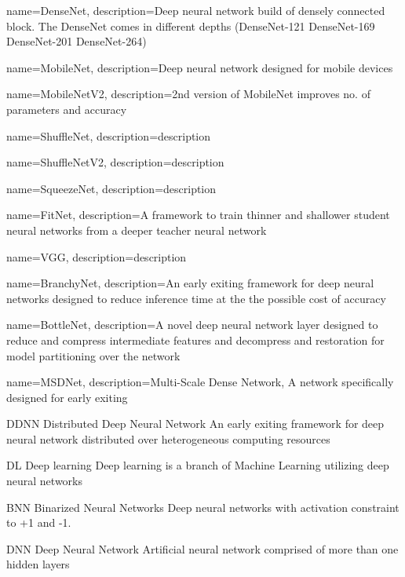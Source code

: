 {
	name={DenseNet},
	description={Deep neural network build of densely connected block. The DenseNet comes in different depths (DenseNet-121 DenseNet-169 DenseNet-201 DenseNet-264)}
}

{
	name={MobileNet},
	description={Deep neural network designed for mobile devices}
}

{
	name={MobileNetV2},
	description={2nd version of MobileNet improves no. of parameters and accuracy}
}

{
	name={ShuffleNet},
	description={description}
}

{
	name={ShuffleNetV2},
	description={description}
}

{
	name={SqueezeNet},
	description={description}
}

{
	name={FitNet},
	description={A framework to train thinner and shallower student neural networks from a deeper teacher neural network}
}

{
	name={VGG},
	description={description}
}


{
	name={BranchyNet},
	description={An early exiting framework for deep neural networks designed to reduce inference time at the the possible cost of accuracy}
}

{
	name={BottleNet},
	description={A novel deep neural network layer designed to reduce and compress intermediate features and decompress and restoration for model partitioning over the network}
}

{
	name={MSDNet},
	description={Multi-Scale Dense Network, A network specifically designed for early exiting}
}


	
	
	{DDNN}
	{Distributed Deep Neural Network}
	{An early exiting framework for deep neural network distributed over heterogeneous computing resources}
	
	{DL}
	{Deep learning}
	{Deep learning is a branch of Machine Learning utilizing deep neural networks}
	
	{BNN}
	{Binarized Neural Networks}
	{Deep neural networks with activation constraint to +1 and -1.}
	
	{DNN}
	{Deep Neural Network}
	{Artificial neural network comprised of more than one hidden layers}
	
